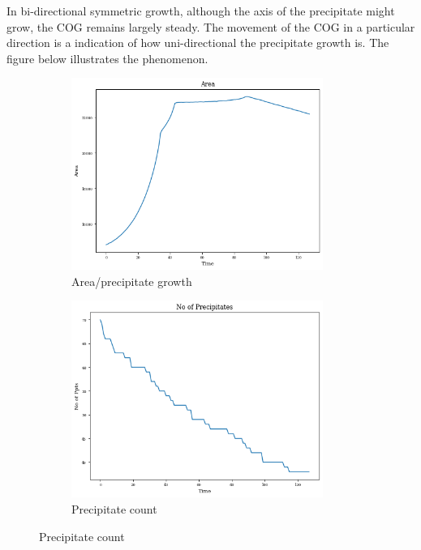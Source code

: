 \documentclass[12pt, a4paper]{report}
\begin{document}
In bi-directional symmetric growth, although the axis of the precipitate might grow, the COG remains largely steady. The movement of the COG in a particular direction is a indication of how uni-directional the precipitate growth is. The figure below illustrates the phenomenon.

\begin{figure}[H]
\centering
\begin{subfigure}{.45\textwidth}
  \centering
  \includegraphics[width=0.9\textwidth]{Pictures/Results/1area.jpeg}
  \caption{Area/precipitate growth}
  \label{img:microstrImg}
\end{subfigure}
\begin{subfigure}{.45\textwidth}
  \centering
  \includegraphics[width=0.9\textwidth]{Pictures/Results/1ppts.jpeg}
  \caption{Precipitate count}
  \label{img:microstrImg}

\end{subfigure}
\end{figure}
\end{document}
